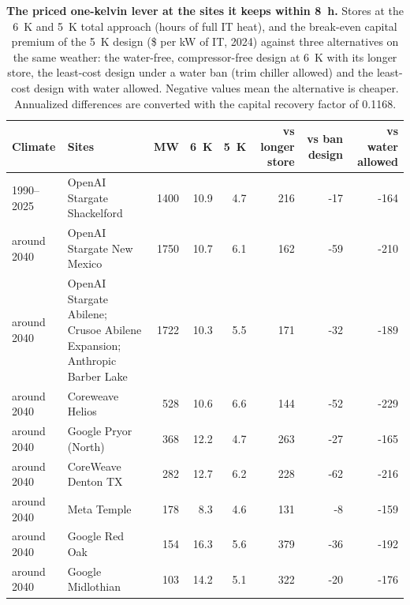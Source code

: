 \begin{table}[p]
\centering
\footnotesize
\setlength{\tabcolsep}{3pt}
\caption{\textbf{The priced one-kelvin lever at the sites it keeps within 8~h.} Stores at the 6~K and 5~K total approach (hours of full IT heat), and the break-even capital premium of the 5~K design (\$ per kW of IT, 2024) against three alternatives on the same weather: the water-free, compressor-free design at 6~K with its longer store, the least-cost design under a water ban (trim chiller allowed) and the least-cost design with water allowed. Negative values mean the alternative is cheaper. Annualized differences are converted with the capital recovery factor of 0.1168.}\label{tab:s8}
\begin{tabular}{@{}lp{58mm}rrrrrr@{}}
\toprule
Climate & Sites & MW & \hstar{} 6~K & \hstar{} 5~K & vs longer store & vs ban design & vs water allowed\\
\midrule
1990--2025 & OpenAI Stargate Shackelford & 1400 & 10.9 & 4.7 & 216 & -17 & -164 \\
around 2040 & OpenAI Stargate New Mexico & 1750 & 10.7 & 6.1 & 162 & -59 & -210 \\
around 2040 & OpenAI Stargate Abilene; Crusoe Abilene Expansion; Anthropic Barber Lake & 1722 & 10.3 & 5.5 & 171 & -32 & -189 \\
around 2040 & Coreweave Helios & 528 & 10.6 & 6.6 & 144 & -52 & -229 \\
around 2040 & Google Pryor (North) & 368 & 12.2 & 4.7 & 263 & -27 & -165 \\
around 2040 & CoreWeave Denton TX & 282 & 12.7 & 6.2 & 228 & -62 & -216 \\
around 2040 & Meta Temple & 178 & 8.3 & 4.6 & 131 & -8 & -159 \\
around 2040 & Google Red Oak & 154 & 16.3 & 5.6 & 379 & -36 & -192 \\
around 2040 & Google Midlothian & 103 & 14.2 & 5.1 & 322 & -20 & -176 \\
\bottomrule
\end{tabular}
\end{table}
